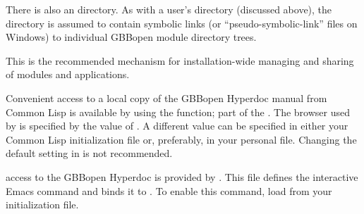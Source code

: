 \documentclass[10pt,twoside,english,pdftex]{article}
\begin{document}
\label{sec:shared-gbbopen-modules-directory}

%
%
%
%
%
There is also an
 directory.
As with a user's  directory (discussed above),
the  directory is assumed to contain
symbolic links (or ``pseudo-symbolic-link'' files on Windows) to individual
GBBopen module directory trees.

This is the recommended mechanism for installation-wide managing and sharing
of modules and applications.

\label{sec:hyperdoc}
%
%
%
%
%
%
%
%
%
%
%

Convenient access to a local copy of the GBBopen Hyperdoc manual from Common
Lisp is available by using the 
function; part of the 
. The browser used by 
is specified by the value of .  A
different value can be specified in either your Common Lisp initialization
file or, preferably, in your personal  file.
Changing the default setting in  is not recommended.

 access to the
GBBopen Hyperdoc is provided by
.  This file
defines the interactive Emacs command  and
binds it to .  To enable this command, load
 from your
 initialization file.
\end{document}
